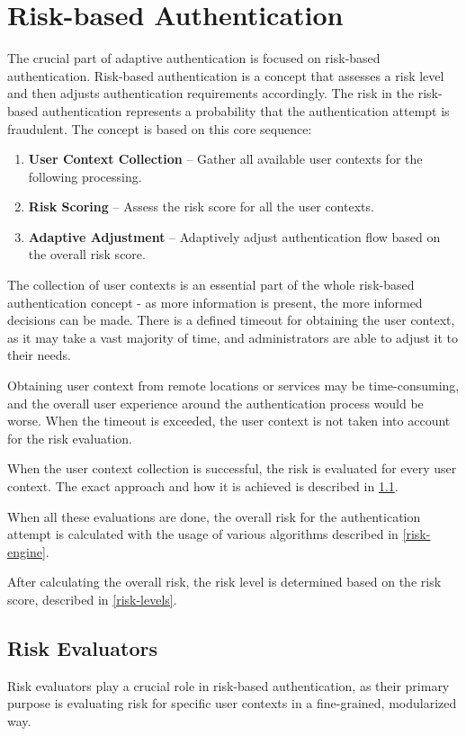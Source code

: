 \newpage
\section{Risk-based Authentication}
The crucial part of adaptive authentication is focused on risk-based authentication.
Risk-based authentication is a concept that assesses a risk level and then adjusts authentication requirements accordingly.
The risk in the risk-based authentication represents a probability that the authentication attempt is fraudulent.
\newline
\newline
The concept is based on this core sequence:
\begin{enumerate}
    \item \textbf{User Context Collection} -- Gather all available user contexts for the following processing. 
    \item \textbf{Risk Scoring} -- Assess the risk score for all the user contexts. 
    \item \textbf{Adaptive Adjustment} -- Adaptively adjust authentication flow based on the overall risk score.
\end{enumerate}

The collection of user contexts is an essential part of the whole risk-based authentication concept - as more information is present, the more informed decisions can be made.
There is a defined timeout for obtaining the user context, as it may take a vast majority of time, and administrators are able to adjust it to their needs.

Obtaining user context from remote locations or services may be time-consuming, and the overall user experience around the authentication process would be worse.
When the timeout is exceeded, the user context is not taken into account for the risk evaluation.

When the user context collection is successful, the risk is evaluated for every user context.
The exact approach and how it is achieved is described in \ref{risk-evaluators}.

When all these evaluations are done, the overall risk for the authentication attempt is calculated with the usage of various algorithms described in \ref{risk-engine}.

After calculating the overall risk, the risk level is determined based on the risk score, described in \ref{risk-levels}.

\newpage
\subsection{Risk Evaluators} \label{risk-evaluators}
Risk evaluators play a crucial role in risk-based authentication, as their primary purpose is evaluating risk for specific user contexts in a fine-grained, modularized way.

